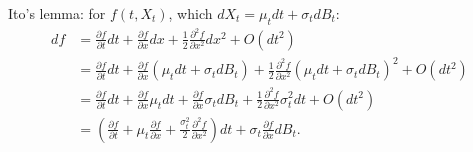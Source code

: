 \documentclass[9pt,twocolumn]{extarticle}
\begin{document}
Ito's lemma: for $f(t,X_t)$, which $dX_t = \mu_t dt + \sigma_t dB_t$:
\begin{align*}
df &= \frac{\partial f}{\partial t} dt + \frac{\partial f}{\partial x} dx + \frac{1}{2} \frac{\partial^2 f}{\partial x^2} dx^2 + O(dt^2) \\
   &= \frac{\partial f}{\partial t} dt + \frac{\partial f}{\partial x} (\mu_t dt + \sigma_t dB_t) + \frac{1}{2} \frac{\partial^2 f}{\partial x^2} (\mu_t dt + \sigma_t dB_t)^2 + O(dt^2) \\
   &= \frac{\partial f}{\partial t} dt + \frac{\partial f}{\partial x} \mu_t dt + \frac{\partial f}{\partial x}\sigma_t dB_t + \frac{1}{2} \frac{\partial^2 f}{\partial x^2} \sigma_t^2 dt + O(dt^2) \\
   &= \left(\frac{\partial f}{\partial t} + \mu_t \frac{\partial f}{\partial x}+\frac{\sigma_t^2}{2}\frac{\partial^2 f}{\partial x^2}\right) dt + \sigma_t \frac{\partial f}{\partial x}dB_t.
\end{align*}
\end{document}
